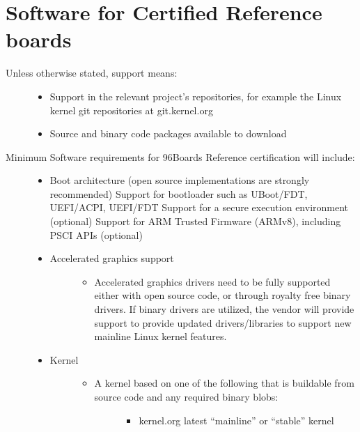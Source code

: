 \documentclass[a4paper,10pt,oneside,english]{sphinxmanual}
\begin{document}
\section{Software for Certified Reference boards}
\label{\detokenize{chapter1-ce:software-for-certified-reference-boards}}\begin{description}
\item[{Unless otherwise stated, support means:}] \leavevmode\begin{itemize}
\item {} 
\sphinxAtStartPar
Support in the relevant project’s repositories, for example the Linux kernel git repositories at git.kernel.org

\item {} 
\sphinxAtStartPar
Source and binary code packages available to download

\end{itemize}

\item[{Minimum Software requirements for 96Boards Reference certification will include:}] \leavevmode\begin{itemize}
\item {} 
\sphinxAtStartPar
Boot architecture (open source implementations are strongly recommended)
\sphinxhyphen{} Support for bootloader such as U\sphinxhyphen{}Boot/FDT, UEFI/ACPI, UEFI/FDT
\sphinxhyphen{} Support for a secure execution environment (optional)
\sphinxhyphen{} Support for ARM Trusted Firmware (ARMv8), including PSCI APIs (optional)

\item {} \begin{description}
\item[{Accelerated graphics support}] \leavevmode\begin{itemize}
\item {} 
\sphinxAtStartPar
Accelerated graphics drivers need to be fully supported either with open source code, or through royalty free binary drivers. If binary drivers are utilized, the vendor will provide support to provide updated drivers/libraries to support new mainline Linux kernel features.

\end{itemize}

\end{description}

\item {} \begin{description}
\item[{Kernel}] \leavevmode\begin{itemize}
\item {} \begin{description}
\item[{A kernel based on one of the following that is buildable from source code and any required binary blobs:}] \leavevmode\begin{itemize}
\item {} 
\sphinxAtStartPar
kernel.org latest “mainline” or “stable” kernel


\end{itemize}
\end{description}
\end{itemize}
\end{description}
\end{itemize}
\end{description}
\end{document}
